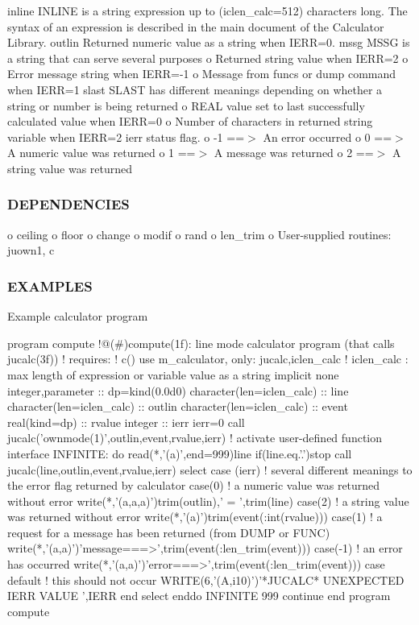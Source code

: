 inline I\+N\+L\+I\+NE is a string expression up to (iclen\+\_\+calc=512) characters long. The syntax of an expression is described in the main document of the Calculator Library. outlin Returned numeric value as a string when I\+E\+RR=0. mssg M\+S\+SG is a string that can serve several purposes o Returned string value when I\+E\+RR=2 o Error message string when I\+E\+RR=-\/1 o Message from \textquotesingle{}funcs\textquotesingle{} or \textquotesingle{}dump\textquotesingle{} command when I\+E\+RR=1 slast S\+L\+A\+ST has different meanings depending on whether a string or number is being returned o R\+E\+AL value set to last successfully calculated value when I\+E\+RR=0 o Number of characters in returned string variable when I\+E\+RR=2 ierr status flag. o -\/1 ==$>$ An error occurred o 0 ==$>$ A numeric value was returned o 1 ==$>$ A message was returned o 2 ==$>$ A string value was returned \subsubsection*{D\+E\+P\+E\+N\+D\+E\+N\+C\+I\+ES}

o ceiling o floor o change o modif o rand o len\+\_\+trim o User-\/supplied routines\+: juown1, c \subsubsection*{E\+X\+A\+M\+P\+L\+ES}

Example calculator program \begin{DoxyVerb}program compute
!@(#)compute(1f): line mode calculator program (that calls jucalc(3f))
!     requires:
!     c()
use m_calculator, only: jucalc,iclen_calc
! iclen_calc : max length of expression or variable value as a string
implicit none
integer,parameter         :: dp=kind(0.0d0)
character(len=iclen_calc) :: line
character(len=iclen_calc) :: outlin
character(len=iclen_calc) :: event
real(kind=dp)             :: rvalue
integer                   :: ierr
ierr=0
call jucalc('ownmode(1)',outlin,event,rvalue,ierr)
! activate user-defined function interface
INFINITE: do
   read(*,'(a)',end=999)line
   if(line.eq.'.')stop
   call jucalc(line,outlin,event,rvalue,ierr)
   select case (ierr)
   ! several different meanings to the error flag returned by calculator
   case(0)
   ! a numeric value was returned without error
     write(*,'(a,a,a)')trim(outlin),' = ',trim(line)
   case(2)
   ! a string value was returned without error
     write(*,'(a)')trim(event(:int(rvalue)))
   case(1)
   ! a request for a message has been returned (from DUMP or FUNC)
     write(*,'(a,a)')'message===>',trim(event(:len_trim(event)))
   case(-1)
   ! an error has occurred
     write(*,'(a,a)')'error===>',trim(event(:len_trim(event)))
   case default
   ! this should not occur
     WRITE(6,'(A,i10)')'*JUCALC* UNEXPECTED IERR VALUE ',IERR
   end select
enddo INFINITE
999 continue
end program compute
\end{DoxyVerb}


